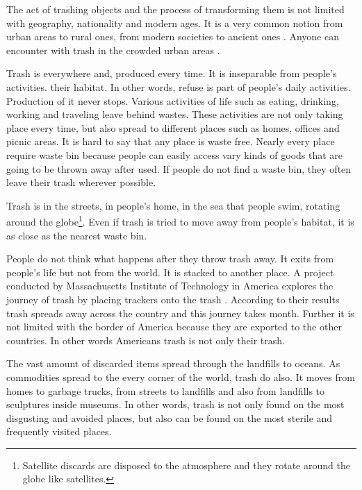 The act of trashing objects and the process of transforming them is not limited with geography, nationality and modern ages. It is a very common notion from urban areas to rural ones, from modern societies to ancient ones \citep[33]{rathje1992rubbish}. Anyone can encounter with trash in the crowded urban areas  \citep[16]{cerny1996recycled}.

Trash is everywhere and, produced every time. It is inseparable from people’s activities.  \citep[xxv]{zimring2012encyclopedia} their habitat. In other words, refuse is part of people’s daily activities. Production of it never stops. Various activities of life such as eating, drinking, working and traveling leave behind wastes. These activities are not only taking place every time, but also spread to different places such as homes, offices and picnic areas. It is hard to say that any place is waste free. Nearly every place require waste bin because people can easily access vary kinds of goods that are going to be thrown away after used. If people do not find a waste bin, they often leave their trash wherever possible.

Trash is in the streets, in people’s home, in the sea that people swim, rotating around the globe\footnote{Satellite discards are disposed to the atmosphere and they rotate around the globe like satellites.}. Even if trash is tried to move away from people’s habitat, it is as close as the nearest waste bin.

People do not think what happens after they throw trash away.  It exits from people’s life but not from the world. It is stacked to another place. A project conducted by Massachusetts Institute of Technology in America explores the journey of trash by placing trackers onto the trash \citep{chen2009mit}. According to their results trash spreads away across the country and this journey takes month. Further it is not limited with the border of America because they are exported to the other countries. In other words Americans trash is not only their trash.

The vast amount of discarded items spread through the landfills to oceans. As commodities spread to the every corner of the world, trash do also. It moves from homes to garbage trucks, from streets to landfills and also from landfills to sculptures inside museums. In other words, trash is not only found on the most disgusting and avoided places, but also can be found on the most sterile and frequently visited places.

